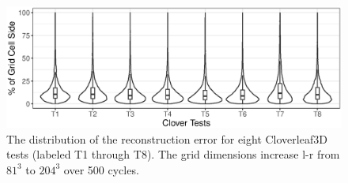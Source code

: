\begin{figure}[!t]
\vspace{-2mm}
\centering
\includegraphics[width=\linewidth]{Images/Clover_Tests_1_8.eps}
\caption{The distribution of the reconstruction error for eight Cloverleaf3D tests (labeled T1 through T8). The grid dimensions increase l-r from $81^{3}$ to $204^{3}$ over 500 cycles.}
\label{fig:clover_plot}
\vspace{-3mm}
\end{figure}
